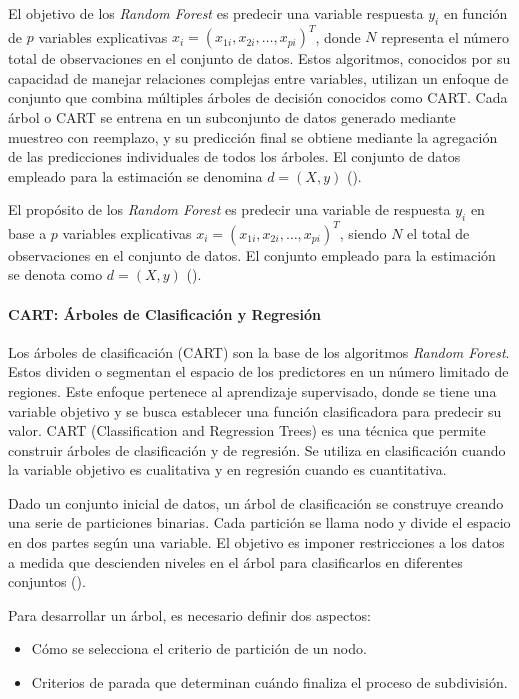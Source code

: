 El objetivo de los \textit{Random Forest} es predecir una variable respuesta \(y_i\) en función de \(p\) variables explicativas \(x_i = (x_{1i}, x_{2i}, \ldots, x_{pi})^T\), donde \(N\) representa el número total de observaciones en el conjunto de datos. Estos algoritmos, conocidos por su capacidad de manejar relaciones complejas entre variables, utilizan un enfoque de conjunto que combina múltiples árboles de decisión conocidos como CART. Cada árbol o CART se entrena en un subconjunto de datos generado mediante muestreo con reemplazo, y su predicción final se obtiene mediante la agregación de las predicciones individuales de todos los árboles. El conjunto de datos empleado para la estimación se denomina \(d = (X, y)\) (\cite{ho1995random}).

El propósito de los \textit{Random Forest} es predecir una variable de respuesta \(y_i\) en base a \(p\) variables explicativas \(x_i = (x_{1i}, x_{2i}, \ldots, x_{pi})^T\), siendo \(N\) el total de observaciones en el conjunto de datos. El conjunto empleado para la estimación se denota como \(d = (X, y)\) (\cite{ho1995random}).

\paragraph{CART: Árboles de Clasificación y Regresión}
Los árboles de clasificación (CART) son la base de los algoritmos \textit{Random Forest}. Estos dividen o segmentan el espacio de los predictores en un número limitado de regiones. Este enfoque pertenece al aprendizaje supervisado, donde se tiene una variable objetivo y se busca establecer una función clasificadora para predecir su valor. CART (Classification and Regression Trees) es una técnica que permite construir árboles de clasificación y de regresión. Se utiliza en clasificación cuando la variable objetivo es cualitativa y en regresión cuando es cuantitativa.

Dado un conjunto inicial de datos, un árbol de clasificación se construye creando una serie de particiones binarias. Cada partición se llama nodo y divide el espacio en dos partes según una variable. El objetivo es imponer restricciones a los datos a medida que descienden niveles en el árbol para clasificarlos en diferentes conjuntos (\cite{wu2008top}).

Para desarrollar un árbol, es necesario definir dos aspectos:
\begin{itemize}
	\item Cómo se selecciona el criterio de partición de un nodo.
	\item Criterios de parada que determinan cuándo finaliza el proceso de subdivisión.
\end{itemize}


